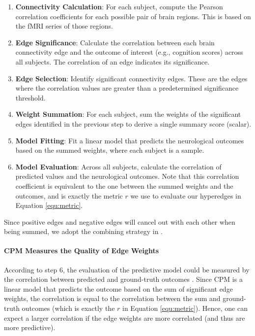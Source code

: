 \begin{enumerate}[topsep=0pt,itemsep=-1ex,partopsep=1ex,parsep=1ex]
    \item \textbf{Connectivity Calculation}: For each subject, compute the Pearson correlation coefficients for each possible pair of brain regions. This is based on the fMRI series of those regions.
    \item \textbf{Edge Significance}: Calculate the correlation between each brain connectivity edge and the outcome of interest (e.g., cognition scores) across all subjects. The correlation of an edge indicates its significance.
    \item \textbf{Edge Selection}: Identify significant connectivity edges. These are the edges where the correlation values are greater than a predetermined significance threshold.
    \item \textbf{Weight Summation}: For each subject, sum the weights of the significant edges identified in the previous step to derive a single summary score (scalar).
    \item \textbf{Model Fitting}: Fit a linear model that predicts the neurological outcomes based on the summed weights, where each subject is a sample.
    \item \textbf{Model Evaluation}: Across all subjects, calculate the correlation of predicted values and the neurological outcomes. Note that this correlation coefficient is equivalent to the one between the summed weights and the outcomes, and is exactly the metric $r$ we use to evaluate our hyperedges in Equation \ref{equ:metric}.
\end{enumerate}
Since positive edges and negative edges will cancel out with each other when being summed, we adopt the combining strategy in \cite{boyle2023connectome}.

\paragraph{CPM Measures the Quality of Edge Weights}
According to step 6, the evaluation of the predictive model could be measured by the correlation between predicted and ground-truth outcomes \cite{shen2017using}. Since CPM is a linear model that predicts the outcome based on the sum of significant edge weights, the correlation is equal to the correlation between the sum and ground-truth outcomes (which is exactly the $r$ in Equation \ref{equ:metric}). Hence, one can expect a larger correlation if the edge weights are more correlated (and thus are more predictive).

